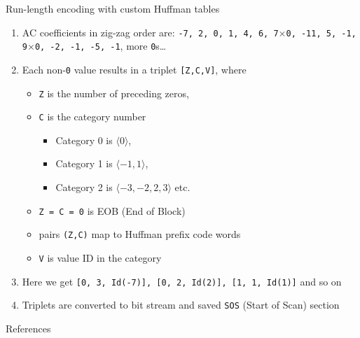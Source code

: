 \documentclass[10pt,aspectratio=169]{beamer}
\begin{document}
\begin{frame}{Run-length encoding with custom Huffman tables}
	\begin{enumerate}
		\item AC coefficients in zig-zag order are: \texttt{-7, 2, 0, 1, 4, 6, 7$\times$0, -11, 5, -1, 9$\times$0, -2, -1, -5, -1}, more \texttt{0}s\dots
		\item Each non-\texttt{0} value results in a triplet \texttt{[Z,C,V]}, where
		\begin{itemize}
			\item \texttt{Z} is the number of preceding zeros,
			\item \texttt{C} is the category number
			\begin{itemize}
				\item Category 0 is $\langle 0 \rangle$,
				\item Category 1 is $\langle -1, 1 \rangle$,
				\item Category 2 is $\langle -3, -2, 2, 3 \rangle$ etc.
			\end{itemize}
			\item \texttt{Z = C = 0} is EOB (End of Block)
			\item pairs \texttt{(Z,C)} map to Huffman prefix code words
			\item \texttt{V} is value ID in the category
		\end{itemize}
		\item Here we get \texttt{[0, 3, Id(-7)], [0, 2, Id(2)], [1, 1, Id(1)]} and so on
		\item Triplets are converted to bit stream and saved \texttt{SOS} (Start of Scan) section
	\end{enumerate}
\end{frame}

\begin{frame}{References}
	\nocite{cp2015jpeg}
	\nocite{epfl2016jpeg}
	\nocite{charette2017anatomy}
	\nocite{sayood2017introduction}
	
	
\end{frame}
\end{document}
